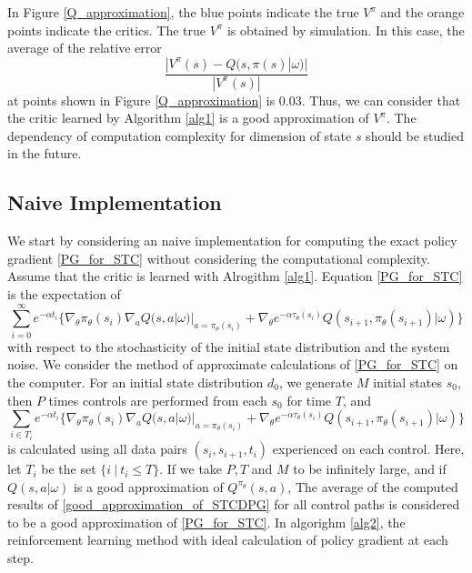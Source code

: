 \documentclass[english, dvipdfmx]{ampmt}             %
\begin{document}
In Figure \ref{Q_approximation}, the blue points indicate the true $V^{\pi}$ and the orange points indicate the critics. The true $V^{\pi}$ is obtained by simulation. 
In this case, the average of the relative error
\begin{equation}
	\frac{|V^{\pi}(s)-Q(s, \pi(s)|\omega)|}{|V^{\pi}(s)|}
\end{equation}
at points shown in Figure \ref{Q_approximation} is 0.03. Thus, we can consider that the critic learned by Algorithm \ref{alg1} is a good approximation of $V^{\pi}$. The dependency of computation complexity for dimension of state $s$ should be studied in the future.

\subsection{Naive Implementation}
We start by considering an naive implementation for computing the exact policy gradient \eqref{PG_for_STC} without considering the computational complexity. Assume that the critic is learned with Alrogithm \ref{alg1}. Equation \eqref{PG_for_STC} is the expectation of
\begin{equation}
	\sum_{i=0}^{\infty} e^{-\alpha t_i}\{\nabla_{\theta}\pi_{\theta}(s_i)\nabla_{a}Q(s,a|\omega)|_{a=\pi_{\theta}(s_i)} + \nabla_{\theta}e^{-\alpha\tau_{\theta}(s_{i})}Q(s_{i+1},\pi_{\theta}(s_{i+1})|\omega)\} \label{path_gradient}
\end{equation}
with respect to the stochasticity of the initial state distribution and the system noise. We consider the method of approximate calculations of \eqref{PG_for_STC} on the computer. For an initial state distribution $d_0$, we generate $M$ initial states $s_0$, then $P$ times controls are performed from each $s_0$ for time $T$, and
\begin{equation}
	\sum_{i\in T_i} e^{-\alpha t_i}\{\nabla_{\theta}\pi_{\theta}(s_i)\nabla_{a}Q(s,a|\omega)|_{a=\pi_{\theta}(s_i)} + \nabla_{\theta}e^{-\alpha\tau_{\theta}(s_{i})}Q(s_{i+1},\pi_{\theta}(s_{i+1})|\omega)\} \label{good_approximation_of_STCDPG}
\end{equation}
is calculated using all data pairs $(s_i,s_{i+1}, t_i)$ experienced on each control. Here, let $T_i$ be the set $\{i~|~t_i \leq T\}$. If we take $P, T$ and $M$ to be infinitely large, and if $Q(s,a|\omega)$ is a good approximation of $Q^{\pi_{\theta}}(s,a)$, The average of the computed results of \eqref{good_approximation_of_STCDPG} for all control paths is considered to be a good approximation of \eqref{PG_for_STC}. In algorighm \ref{alg2}, the reinforcement learning method with ideal calculation of policy gradient at each step. 
\end{document}
